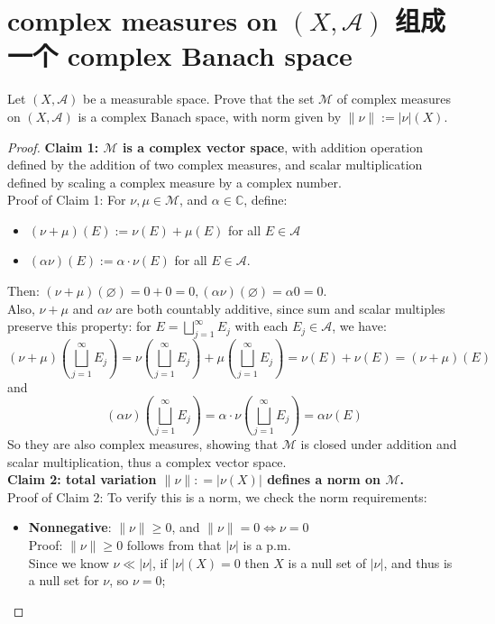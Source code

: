 \documentclass[lang=cn,11pt]{elegantbook}
\begin{document}
  \section { complex measures on $(X,\mathcal{A})$ 组成一个 complex Banach space}
  Let $(X,\mathcal{A})$ be a measurable space. Prove that the set $\mathcal{M}$ of complex measures on $(X,\mathcal{A})$ is a complex Banach space, with norm given by $\|\nu\|:=|\nu|(X)$. 
\begin{proof}
 \textbf{   Claim 1: $\mathcal{M}$ is a complex vector space}, with addition operation defined by the addition of two complex measures, and scalar multiplication defined by scaling a complex measure by a complex number.\\
 Proof of Claim 1: 
For $\nu, \mu \in \mathcal{M}$, and $\alpha \in \mathbb{C}$, define:
    \begin{itemize}
        \item $(\nu+\mu)(E):=\nu(E)+\mu(E)$ for all $E \in \mathcal{A}$
        \item $(\alpha \nu)(E):=\alpha \cdot \nu(E)$ for all $E \in \mathcal{A}$.
    \end{itemize}
Then: $(\nu+\mu)(\varnothing)  = 0  + 0  = 0, (\alpha \nu)(\varnothing) = \alpha 0 = 0$.\\
Also, $\nu+\mu$ and $\alpha \nu$ are both countably additive, since sum and scalar multiples preserve this property: for $E = \bigsqcup_{j=1}^\infty E_j$ with each $E_j \in \mathcal{A}$, we have:     \[
(\nu + \mu) (\bigsqcup_{j=1}^\infty E_j) = \nu  (\bigsqcup_{j=1}^\infty E_j) + \mu (\bigsqcup_{j=1}^\infty E_j) = \nu (E ) + \nu(E) = (\nu + \mu) (E)
\]and \[
(\alpha \nu)(\bigsqcup_{j=1}^\infty E_j)  = \alpha \cdot \nu(\bigsqcup_{j=1}^\infty E_j) = \alpha \nu (E)
\]So they are also complex measures, showing that $\mathcal{M}$ is closed under addition and scalar multiplication, thus a complex vector space.\\
\textbf{Claim 2: total variation $\| \nu \| : = | \nu(X)|$ defines a norm on $\mathcal{M}$.}\\
Proof of Claim 2: 
To verify this is a norm, we check the norm requirements:
\begin{itemize}
    \item  \textbf{Nonnegative}: $\|\nu\| \geq 0$, and $\|\nu\|=0 \Longleftrightarrow \nu=0$\\
Proof: $\|\nu\| \geq 0$ follows from that $|\nu|$ is a p.m.\\
Since we know $\nu \ll |\nu | $, if $ |\nu|(X) = 0$ then $X$ is a null set of $|\nu|$, and thus is a null set for $\nu$, so $\nu = 0$; \\

\end{itemize}
\end{proof}
\end{document}
